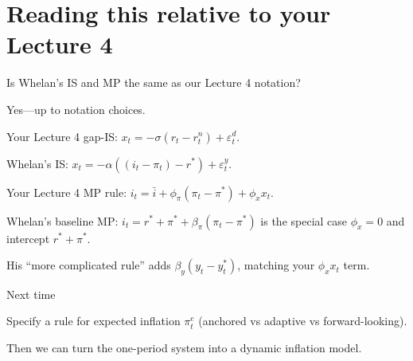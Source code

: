 \documentclass[aspectratio=169,xcolor=dvipsnames]{beamer}
\let\tempone\itemize
\let\temptwo\enditemize
\renewenvironment{itemize}{\tempone\addtolength{\itemsep}{\fill}}{\temptwo}
\begin{document}
\section{Reading this relative to your Lecture 4}

\begin{frame}{Is Whelan's IS and MP the same as our Lecture 4 notation?}
\begin{itemize}
\item Yes---up to notation choices.
\item Your Lecture 4 gap-IS: $x_t=-\sigma(r_t-r_t^n)+\varepsilon_t^d$.
\item Whelan's IS: $x_t=-\alpha((i_t-\pi_t)-r^\ast)+\varepsilon_t^y$.
\end{itemize}

\begin{itemize}
\item Your Lecture 4 MP rule: $i_t=\bar i+\phi_\pi(\pi_t-\pi^\ast)+\phi_x x_t$.
\item Whelan's baseline MP: $i_t=r^\ast+\pi^\ast+\beta_\pi(\pi_t-\pi^\ast)$ is the special case $\phi_x=0$ and intercept $r^\ast+\pi^\ast$.
\item His ``more complicated rule'' adds $\beta_y(y_t-y_t^\ast)$, matching your $\phi_x x_t$ term.
\end{itemize}
\end{frame}

\begin{frame}{Next time}
\begin{itemize}
\item Specify a rule for expected inflation $\pi_t^e$ (anchored vs adaptive vs forward-looking).
\item Then we can turn the one-period system into a dynamic inflation model.
\end{itemize}
\end{frame}
\end{document}
